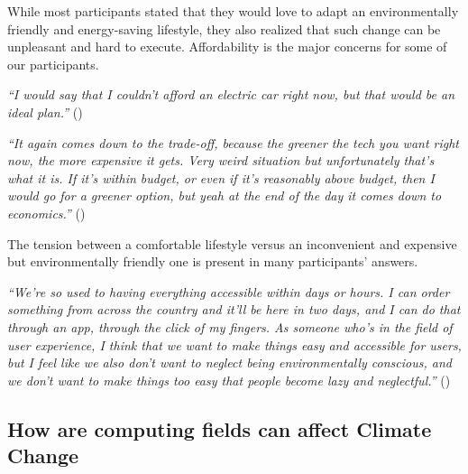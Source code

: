     While most participants stated that they would love to adapt an environmentally friendly and energy-saving lifestyle, they also realized that such change can be unpleasant and hard to execute. Affordability is the major concerns for some of our participants. %
    
    \begin{quoting}
        \textit{``I would say that I couldn't afford an electric car right now, but that would be an ideal plan.''} ()
    \end{quoting}
    
    \begin{quoting}
        \textit{``It again comes down to the trade-off, because the greener the tech you want right now, the more expensive it gets. Very weird situation but unfortunately that's what it is. If it's within budget, or even if it's reasonably above budget, then I would go for a greener option, but yeah at the end of the day it comes down to economics.''} ()
    \end{quoting}
    
    The tension between a comfortable lifestyle versus an inconvenient and expensive but environmentally friendly one is present in many participants' answers. %
    
    \begin{quoting}
        \textit{``We're so used to having everything accessible within days or hours. I can order something from across the country and it'll be here in two days, and I can do that through an app, through the click of my fingers. As someone who's in the field of user experience, I think that we want to make things easy and accessible for users, but I feel like we also don't want to neglect being environmentally conscious, and we don't want to make things too easy that people become lazy and neglectful.''} ()
    \end{quoting}

    
\subsection{How are computing fields can affect Climate Change}

    
    
